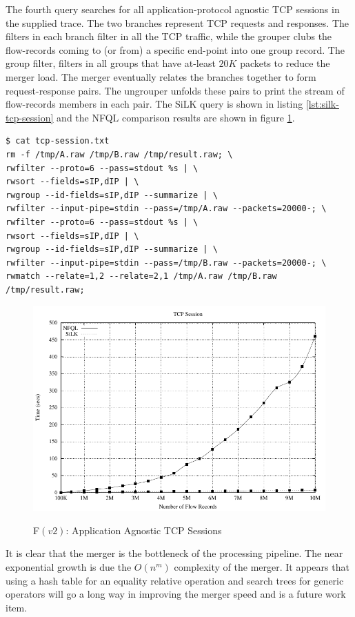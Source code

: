 The fourth query searches for all application-protocol agnostic TCP sessions
in the supplied trace. The two branches represent TCP requests and responses.
The filters in each branch filter in all the TCP traffic, while the grouper
clubs the flow-records coming to (or from) a specific end-point into one group
record. The group filter, filters in all groups that have at-least $20K$
packets to reduce the merger load. The merger eventually
 relates the branches together to
form request-response pairs. The ungrouper unfolds these pairs to print the
stream of flow-records members in each pair. The SiLK query is shown in
listing \ref{lst:silk-tcp-session} and the NFQL comparison results are shown
in figure \ref{fig:tcp-sessions}.


\begin{lstlisting}
$ cat tcp-session.txt
rm -f /tmp/A.raw /tmp/B.raw /tmp/result.raw; \
rwfilter --proto=6 --pass=stdout %s | \
rwsort --fields=sIP,dIP | \
rwgroup --id-fields=sIP,dIP --summarize | \
rwfilter --input-pipe=stdin --pass=/tmp/A.raw --packets=20000-; \
rwfilter --proto=6 --pass=stdout %s | \
rwsort --fields=sIP,dIP | \
rwgroup --id-fields=sIP,dIP --summarize | \
rwfilter --input-pipe=stdin --pass=/tmp/B.raw --packets=20000-; \
rwmatch --relate=1,2 --relate=2,1 /tmp/A.raw /tmp/B.raw /tmp/result.raw;
\end{lstlisting}


\begin{figure}[ht!]
\centering
\includegraphics[width=.55\linewidth]{figures/benchmarks/tcp}\\
\caption{F$(v2)$: Application Agnostic TCP Sessions}
\label{fig:tcp-sessions}
\end{figure}

It is clear that the merger is the bottleneck of the processing pipeline. The
near exponential growth is due the $O(n^m)$ complexity of the merger. It
appears that using a hash table for an equality relative operation and search
trees for generic operators will go a long way in improving the merger speed
and is a future work item.
